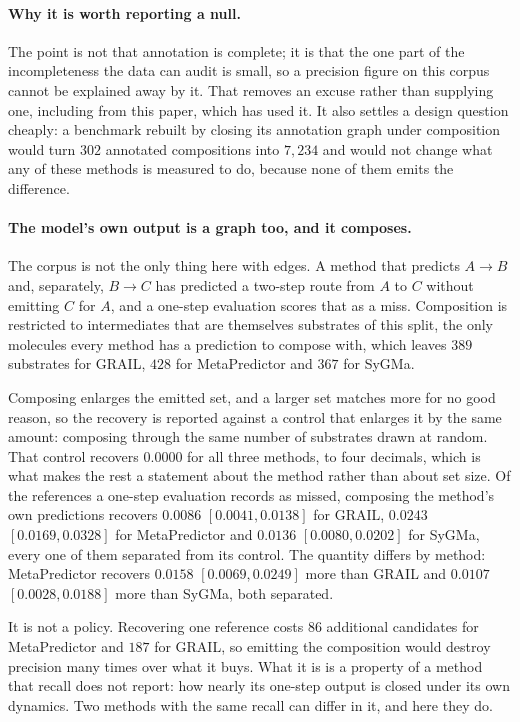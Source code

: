 \paragraph{Why it is worth reporting a null.} The point is not that annotation is complete; it is
that the one part of the incompleteness the data can audit is small, so a precision figure on this
corpus cannot be explained away by it. That removes an excuse rather than supplying one, including
from this paper, which has used it. It also settles a design question cheaply: a benchmark rebuilt
by closing its annotation graph under composition would turn $302$ annotated compositions into
$7{,}234$ and would not change what any of these methods is measured to do, because none of them
emits the difference.

\paragraph{The model's own output is a graph too, and it composes.} The corpus is not the only thing
here with edges. A method that predicts $A \to B$ and, separately, $B \to C$ has predicted a two-step
route from $A$ to $C$ without emitting $C$ for $A$, and a one-step evaluation scores that as a miss.
Composition is restricted to intermediates that are themselves substrates of this split, the only
molecules every method has a prediction to compose with, which leaves $389$ substrates for GRAIL,
$428$ for MetaPredictor and $367$ for SyGMa.

Composing enlarges the emitted set, and a larger set matches more for no good reason, so the
recovery is reported against a control that enlarges it by the same amount: composing through the
same number of substrates drawn at random. That control recovers $0.0000$ for all three methods, to
four decimals, which is what makes the rest a statement about the method rather than about set size.
Of the references a one-step evaluation records as missed, composing the method's own predictions
recovers $0.0086$ $[0.0041,0.0138]$ for GRAIL, $0.0243$ $[0.0169,0.0328]$ for MetaPredictor and
$0.0136$ $[0.0080,0.0202]$ for SyGMa, every one of them separated from its control. The quantity
differs by method: MetaPredictor recovers $0.0158$ $[0.0069,0.0249]$ more than GRAIL and $0.0107$
$[0.0028,0.0188]$ more than SyGMa, both separated.

It is not a policy. Recovering one reference costs $86$ additional candidates for MetaPredictor and
$187$ for GRAIL, so emitting the composition would destroy precision many times over what it buys.
What it is is a property of a method that recall does not report: how nearly its one-step output is
closed under its own dynamics. Two methods with the same recall can differ in it, and here they do.

